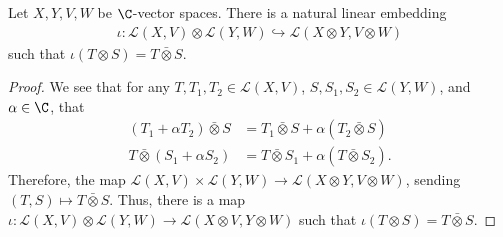 \begin{proposition}
  Let $X,Y,V,W$ be $\C$-vector spaces. There is a natural linear embedding
  \begin{align*}
    \iota\colon \mathcal{L}\left( X,V \right)\otimes \mathcal{L}\left( Y,W \right) \hookrightarrow \mathcal{L}\left( X\otimes Y,V\otimes W \right)
  \end{align*}
  such that $\iota\left( T\otimes S \right) = T\bar{\otimes}S$.
\end{proposition}
\begin{proof}
  We see that for any $T,T_1,T_2\in \mathcal{L}\left( X,V \right)$, $S,S_1,S_2\in \mathcal{L} \left( Y,W \right)$, and $\alpha \in \C$, that
  \begin{align*}
    \left( T_1 + \alpha T_2 \right)\bar{\otimes}S &= T_1\bar{\otimes}S + \alpha \left( T_2\bar{\otimes}S \right)\\
    T\bar{\otimes}\left( S_1 + \alpha S_2 \right) &= T\bar{\otimes}S_1 + \alpha \left( T\bar{\otimes}S_2 \right).
  \end{align*}
  Therefore, the map $\mathcal{L}\left( X,V \right)\times \mathcal{L}\left( Y,W \right) \rightarrow \mathcal{L}\left( X\otimes Y,V\otimes W \right)$, sending $\left( T,S \right)\mapsto T\bar{\otimes}S$. Thus, there is a map $\iota\colon \mathcal{L}\left( X,V \right)\otimes \mathcal{L}\left( Y,W \right)\rightarrow \mathcal{L}\left( X\otimes V,Y\otimes W \right)$ such that $\iota\left( T\otimes S \right) = T\bar{\otimes}S$.\newline


\end{proof}
